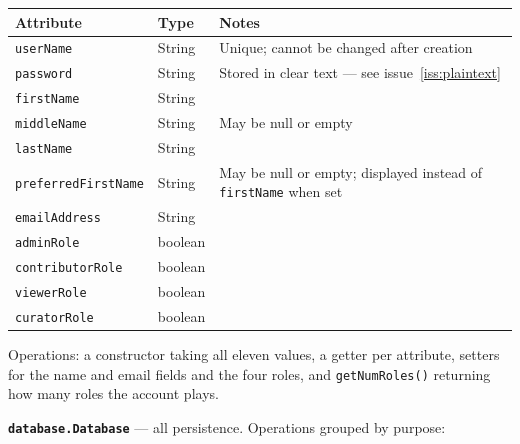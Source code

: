 \documentclass[11pt,a4paper]{article}
\newcommand{\cls}[1]{\texttt{#1}}
\begin{document}
\begin{center}
\begin{tabularx}{\linewidth}{@{}llX@{}}
\toprule
\textbf{Attribute} & \textbf{Type} & \textbf{Notes} \\
\midrule
\cls{userName} & String & Unique; cannot be changed after creation \\
\cls{password} & String & Stored in clear text --- see issue~\ref{iss:plaintext} \\
\cls{firstName} & String & \\
\cls{middleName} & String & May be null or empty \\
\cls{lastName} & String & \\
\cls{preferredFirstName} & String & May be null or empty; displayed instead of
\cls{firstName} when set \\
\cls{emailAddress} & String & \\
\cls{adminRole} & boolean & \\
\cls{contributorRole} & boolean & \\
\cls{viewerRole} & boolean & \\
\cls{curatorRole} & boolean & \\
\bottomrule
\end{tabularx}
\end{center}

Operations: a constructor taking all eleven values, a getter per attribute, setters for the
name and email fields and the four roles, and \cls{getNumRoles()} returning how many roles
the account plays.

\textbf{\cls{database.Database}} --- all persistence. Operations grouped by purpose:
\end{document}
